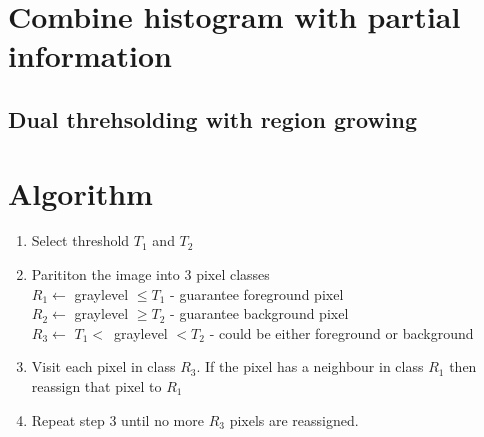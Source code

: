 \documentclass[11pt]{article}
\theoremstyle{definition}
\begin{document}
\pgfplotsset{compat=1.18}

\section{Combine histogram with partial information}
\subsection{Dual threhsolding with region growing}
\section*{Algorithm}
\begin{enumerate}
    \item Select threshold $T_1$ and $T_2$
    \item Parititon the image into 3 pixel classes \\
    $R_1 \longleftarrow$ graylevel $\le T_1$ - guarantee  foreground pixel \\
    $R_2 \longleftarrow$ graylevel $\ge T_2$ - guarantee  background pixel \\
    $R_3 \longleftarrow$ $T_1 < $\ graylevel $< T_2$ - could be either foreground or background
    \item Visit each pixel in class $R_3$. If the pixel has a neighbour  in class $R_1$ then reassign that pixel to $R_1$
    \item Repeat step 3 until no more $R_3$ pixels are reassigned.
\end{enumerate}
\end{document}
